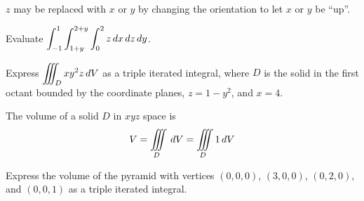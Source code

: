 \documentclass[letterpaper, twoside, 12pt]{book}
\begin{document}
\begin{remark}
  $z$ may be replaced with $x$ or $y$ by changing the orientation to
  let $x$ or $y$ be ``up''.
\end{remark}

          \begin{problem}
            Evaluate
            $\displaystyle\int_{-1}^1\int_{1+y}^{2+y}\int_0^2 z \,d{x}\,d{z}\,d{y}$.
          \end{problem}

          \begin{solution}

          \end{solution}

          \begin{contributors}

          \end{contributors}

          \begin{problem}
            Express $\displaystyle\iiint_D xy^2z \,d{V}$ as a triple iterated integral,
            where $D$ is the solid in the first octant bounded by the
            coordinate planes, $z=1-y^2$, and $x=4$.
          \end{problem}

          \begin{solution}

          \end{solution}

          \begin{contributors}

          \end{contributors}

\begin{theorem}
  The volume of a solid $D$ in $xyz$ space is
  \[V = \iiint\limits_D\,d{V}=\iiint\limits_D 1 \,d{V}\]
\end{theorem}

          \begin{problem}
            Express the volume of the pyramid with vertices
            $(0,0,0)$, $(3,0,0)$, $(0,2,0)$, and $(0,0,1)$
            as a triple iterated integral.
          \end{problem}

          \begin{solution}

          \end{solution}

          \begin{contributors}

          \end{contributors}
\end{document}
